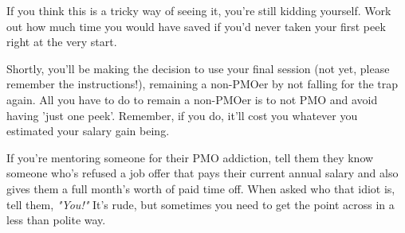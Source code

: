 \documentclass[easypeasy.tex]{subfiles}
\begin{document}
If you think this is a tricky way of seeing it, you're still kidding yourself. Work out how much time you would have saved if you'd never taken your first peek right at the very start.

Shortly, you'll be making the decision to use your final session (not yet, please remember the instructions!), remaining a non-PMOer by not falling for the trap again. All you have to do to remain a non-PMOer is to not PMO and avoid having 'just one peek'. Remember, if you do, it'll cost you whatever you estimated your salary gain being.

If you're mentoring someone for their PMO addiction, tell them they know someone who's refused a job offer that pays their current annual salary and also gives them a full month's worth of paid time off. When asked who that idiot is, tell them, \textit{"You!"} It's rude, but sometimes you need to get the point across in a less than polite way.
\end{document}
